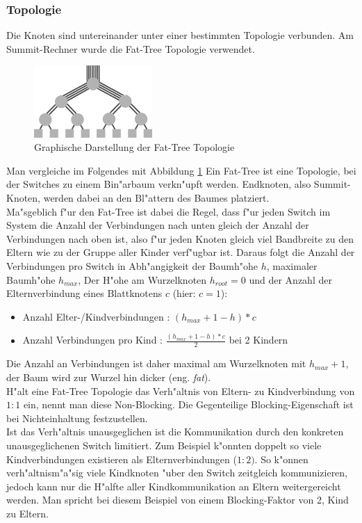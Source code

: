 \subsubsection{Topologie}
Die Knoten sind untereinander unter einer bestimmten Topologie verbunden. Am Summit-Rechner wurde die Fat-Tree Topologie verwendet.\\
\begin{figure}
\centering
\includegraphics[width=0.4\textwidth]{res/fat_tree.png}
\caption{\cite{fattree} Graphische Darstellung der Fat-Tree Topologie}
	\label{fig:fat_tree}
\end{figure}
Man vergleiche im Folgendes mit Abbildung \ref{fig:fat_tree}
Ein Fat-Tree ist eine Topologie, bei der Switches zu einem Bin"arbaum verkn"upft werden. Endknoten, also Summit-Knoten, werden dabei an den Bl"attern des Baumes platziert.\\
Ma"sgeblich f"ur den Fat-Tree ist dabei die Regel, dass f"ur jeden Switch im System die Anzahl der Verbindungen nach unten gleich der Anzahl der Verbindungen nach oben ist, also f"ur jeden Knoten gleich viel Bandbreite zu den Eltern wie zu der Gruppe aller Kinder verf"ugbar ist. Daraus folgt die Anzahl der Verbindungen pro Switch in Abh"angigkeit der Baumh"ohe $h$, maximaler Baumh"ohe $h_{max}$, Der H"ohe am Wurzelknoten $h_{root}=0$ und der Anzahl der Elternverbindung eines Blattknotens $c$ (hier: $c=1$):
\begin{itemize}
	\item Anzahl Elter-/Kindverbindungen : $(h_{max}+1-h)*c$
	\item Anzahl Verbindungen pro Kind : $\frac{(h_{max}+1-h)*c}{2}$ bei 2 Kindern
\end{itemize}
Die Anzahl an Verbindungen ist daher maximal am Wurzelknoten mit $h_{max}+1$, der Baum wird zur Wurzel hin \glqq dicker (eng. \textit{fat})\grqq.\\
H"alt eine Fat-Tree Topologie das Verh"altnis von Eltern- zu Kindverbindung von $1:1$ ein, nennt man diese Non-Blocking. Die Gegenteilige Blocking-Eigenschaft ist bei Nichteinhaltung festzustellen.\\
Ist das Verh"altnis unausgeglichen ist die Kommunikation durch den konkreten unausgeglichenen Switch limitiert. Zum Beispiel k"onnten doppelt so viele Kindverbindungen existieren als Elternverbindungen ($1:2)$. So k"onnen verh"altnism"a"sig viele Kindknoten "uber den Switch zeitgleich kommunizieren, jedoch kann nur die H"alfte aller Kindkommunikation an Eltern weitergereicht werden. Man spricht bei diesem Beispiel von einem Blocking-Faktor von 2, Kind zu Eltern.\\
